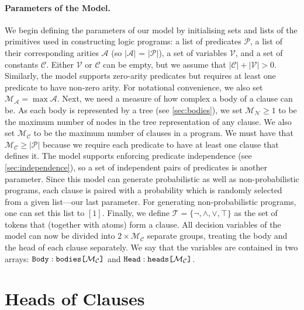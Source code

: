 \documentclass[runningheads]{llncs}
\newcommand{\variable}[1]{\texttt{\textup{#1}}}
\newcommand{\arrayt}[3]{\variable{{#3}} : \variable{{#1}[}{#2}\variable{]}}
\newcommand{\predicates}{\mathcal{P}}
\newcommand{\variables}{\mathcal{V}}
\newcommand{\constants}{\mathcal{C}}
\newcommand{\tokens}{\mathcal{T}}
\newcommand{\arities}{\mathcal{A}}
\newcommand{\maxArity}{\mathcal{M}_{\mathcal{A}}}
\newcommand{\maxNumNodes}{\mathcal{M}_{\mathcal{N}}}
\newcommand{\maxNumClauses}{\mathcal{M}_{\mathcal{C}}}
\begin{document}
\paragraph{Parameters of the Model.} We begin defining the parameters of our
model by initialising sets and lists of the primitives used in constructing
logic programs: a list of predicates $\predicates{}$, a list of their
corresponding arities $\arities{}$ (so $|\arities{}|$ = $|\predicates{}|$), a
set of variables $\variables{}$, and a set of constants $\constants{}$. Either
$\variables{}$ or $\constants{}$ can be empty, but we assume that
$|\constants{}| + |\variables{}| > 0$. Similarly, the model supports zero-arity
predicates but requires at least one predicate to have non-zero arity. For
notational convenience, we also set $\maxArity{} = \max \arities{}$. Next, we
need a measure of how complex a body of a clause can be. As each body is
represented by a tree (see \cref{sec:bodies}), we set $\maxNumNodes{} \ge 1$ to
be the maximum number of nodes in the tree representation of any clause. We also
set $\maxNumClauses{}$ to be the maximum number of clauses in a program. We must
have that $\maxNumClauses{} \ge |\predicates{}|$ because we require each
predicate to have at least one clause that defines it. The model supports
enforcing predicate independence (see \cref{sec:independence}), so a set of
independent pairs of predicates is another parameter. Since this model can
generate probabilistic as well as non-probabilistic programs, each clause is
paired with a probability which is randomly selected from a given list---our
last parameter. For generating non-probabilistic programs, one can set this list
to $[1]$. Finally, we define $\tokens{} = \{ \neg, \land, \lor, \top \}$ as the
set of tokens that (together with atoms) form a clause. All decision variables
of the model can now be divided into $2 \times \maxNumClauses{}$ separate
groups, treating the body and the head of each clause separately. We say that
the variables are contained in two arrays:
$\arrayt{bodies}{\maxNumClauses{}}{Body}$ and
$\arrayt{heads}{\maxNumClauses{}}{Head}$.

\section{Heads of Clauses} \label{sec:heads}
\end{document}
